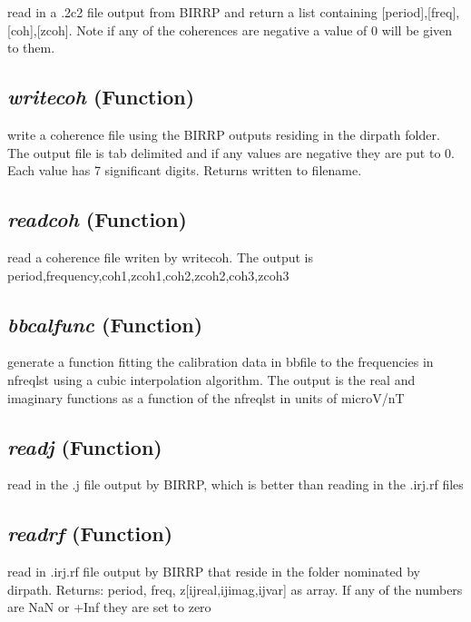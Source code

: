 read in a .2c2 file output from BIRRP and return a list 
    containing [period],[freq],[coh],[zcoh]. Note if any of the coherences are 
    negative a value of 0 will be given to them.

\subsection{\textit{writecoh} (Function)}
\label{ssec:processing.birrptools.writecoh}

write a coherence file using the BIRRP outputs 
    residing in the dirpath folder.  The output file is tab delimited and if any 
    values are negative they are put to 0. Each value has 7 significant digits.
    Returns written to filename.

\subsection{\textit{readcoh} (Function)}
\label{ssec:processing.birrptools.readcoh}

read a coherence file writen by writecoh.  The 
    output is period,frequency,coh1,zcoh1,coh2,zcoh2,coh3,zcoh3

\subsection{\textit{bbcalfunc} (Function)}
\label{ssec:processing.birrptools.bbcalfunc}

generate a function fitting the 
    calibration data in bbfile to the frequencies in nfreqlst using a cubic
    interpolation algorithm.  The output is the real and imaginary functions
    as a function of the nfreqlst in units of microV/nT

\subsection{\textit{readj} (Function)}
\label{ssec:processing.birrptools.readj}

read in the .j file output by BIRRP, which is better than 
    reading in the .irj.rf files

\subsection{\textit{readrf} (Function)}
\label{ssec:processing.birrptools.readrf}


read in .irj.rf file output by BIRRP that reside in 
    the folder nominated by dirpath. Returns: period, freq, 
    z[ijreal,ijimag,ijvar] as array.  If any of the numbers are NaN or +Inf they
    are set to zero


